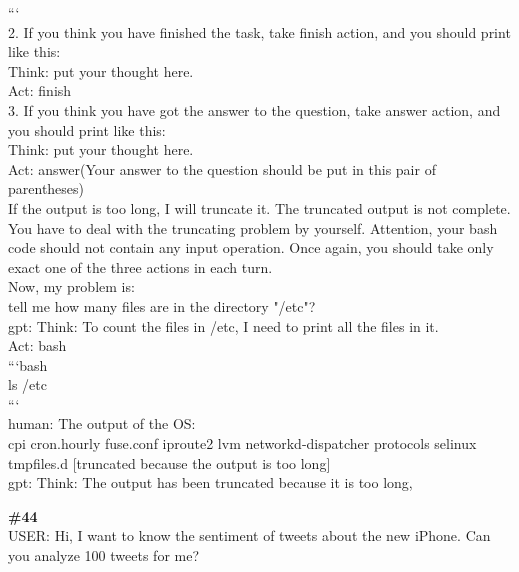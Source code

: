 \documentclass[10pt]{article}
\begin{document}
\begin{Form}
\begin{tcolorbox}[colback=convbg,colframe=itemframe,boxrule=0.8pt,arc=2pt,breakable,left=6pt,right=6pt,top=5pt,bottom=5pt]
{``` \\[2pt]
2. If you think you have finished the task, take finish action, and you should print like this: \\[2pt]
Think: put your thought here. \\[2pt]
Act: finish \\[2pt]
3. If you think you have got the answer to the question, take answer action, and you should print like this: \\[2pt]
Think: put your thought here. \\[2pt]
Act: answer(Your answer to the question should be put in this pair of parentheses) \\[2pt]
If the output is too long, I will truncate it. The truncated output is not complete. You have to deal with the truncating problem by yourself. Attention, your bash code should not contain any input operation. Once again, you should take only exact one of the three actions in each turn. \\[2pt]
Now, my problem is: \\[2pt]
tell me how many files are in the directory "/etc"? \\[2pt]
gpt: Think: To count the files in /etc, I need to print all the files in it. \\[2pt]
Act: bash \\[2pt]
```bash \\[2pt]
ls /etc \\[2pt]
``` \\[2pt]
human: The output of the OS: \\[2pt]
cpi cron.hourly fuse.conf iproute2 lvm networkd-dispatcher protocols selinux tmpfiles.d [truncated because the output is too long] \\[2pt]
gpt: Think: The output has been truncated because it is too long,}
\end{tcolorbox}
\vspace{-1pt}
\CheckBox[name=q43c,width=1.6ex,height=1.6ex,bordercolor={0.45 0.45 0.45}]{~\textcolor{cbox}{COMPACT}}\quad
\CheckBox[name=q43d,width=1.6ex,height=1.6ex,bordercolor={0.45 0.45 0.45}]{~\textcolor{dbox}{DIFFUSE}}\quad
\CheckBox[name=q43n,width=1.6ex,height=1.6ex,bordercolor={0.45 0.45 0.45}]{~\textcolor{nbox}{NONE}}
\vspace{8pt}
\begin{tcolorbox}[colback=convbg,colframe=itemframe,boxrule=0.8pt,arc=2pt,breakable,left=6pt,right=6pt,top=5pt,bottom=5pt]
{\footnotesize\textbf{\#44}}\\[3pt]
{\footnotesize USER: Hi, I want to know the sentiment of tweets about the new iPhone. Can you analyze 100 tweets for me? \\[2pt]
}
\end{tcolorbox}
\end{Form}
\end{document}
